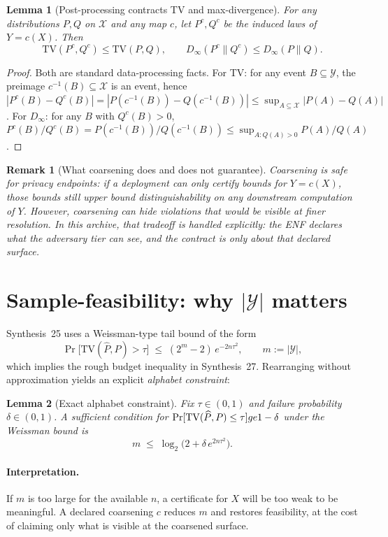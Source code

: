 \documentclass[11pt]{article}
\newtheorem{lemma}{Lemma}
\newtheorem{remark}{Remark}
\newcommand{\TV}{\mathrm{TV}}
\newcommand{\Dinfty}{D_{\infty}}
\begin{document}
\begin{lemma}[Post-processing contracts TV and max-divergence]\label{lem:dataproc}
For any distributions $P,Q$ on $\mathcal X$ and any map $c$, let $P^c,Q^c$ be the induced laws of $Y=c(X)$.
Then
\[\TV(P^c,Q^c)\le \TV(P,Q),\qquad \Dinfty(P^c\|Q^c)\le \Dinfty(P\|Q).\]
\end{lemma}

\begin{proof}
Both are standard data-processing facts.
For TV: for any event $B\subseteq\mathcal Y$, the preimage $c^{-1}(B)\subseteq\mathcal X$ is an event, hence
$|P^c(B)-Q^c(B)|=|P(c^{-1}(B))-Q(c^{-1}(B))|\le \sup_{A\subseteq\mathcal X}|P(A)-Q(A)|$.
For $\Dinfty$: for any $B$ with $Q^c(B)>0$,
$P^c(B)/Q^c(B)=P(c^{-1}(B))/Q(c^{-1}(B))\le \sup_{A:Q(A)>0} P(A)/Q(A)$.
\end{proof}

\begin{remark}[What coarsening does and does not guarantee]
Coarsening is \emph{safe for privacy endpoints}: if a deployment can only certify bounds for $Y=c(X)$, those bounds still upper bound distinguishability on any downstream computation of $Y$.
However, coarsening can hide violations that would be visible at finer resolution.
In this archive, that tradeoff is handled explicitly: the ENF declares what the adversary tier can see, and the contract is only about that declared surface.\cite{series:traceifaces}
\end{remark}

\section{Sample-feasibility: why $|\mathcal Y|$ matters}
Synthesis~25 uses a Weissman-type tail bound of the form
\[\Pr\big[\TV(\widehat P,P) > \tau\big]\;\le\; (2^{m}-2)\,e^{-2n\tau^2},\qquad m:=|\mathcal Y|,\]
which implies the rough budget inequality in Synthesis~27.\cite{series:stataudit,series:bucketdesign}
Rearranging without approximation yields an explicit \emph{alphabet constraint}:
\begin{lemma}[Exact alphabet constraint]\label{lem:alphabet}
Fix $\tau\in(0,1)$ and failure probability $\delta\in(0,1)$.
A sufficient condition for $\Pr[\TV(\widehat P,P)\le \tau]\\ge 1-\delta$ under the Weissman bound is
\[m\;\le\;\log_2\!\bigl(2+\delta\,e^{2n\tau^2}\bigr).\]
\end{lemma}

\paragraph{Interpretation.}
If $m$ is too large for the available $n$, a certificate for $X$ will be too weak to be meaningful.
A declared coarsening $c$ reduces $m$ and restores feasibility, at the cost of claiming only what is visible at the coarsened surface.
\end{document}
